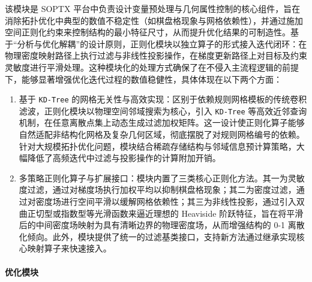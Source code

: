该模块是 SOPTX 平台中负责设计变量预处理与几何属性控制的核心组件，旨在消除拓扑优化中典型的数值不稳定性（如棋盘格现象与网格依赖性），并通过施加空间正则化约束来控制结构的最小特征尺寸，从而提升优化结果的可制造性。基于“分析与优化解耦”的设计原则，正则化模块以独立算子的形式接入迭代闭环：在物理密度映射路径上执行过滤与非线性投影操作，在梯度更新路径上对目标及约束灵敏度进行平滑处理。这种模块化的处理方式确保了在不侵入主流程逻辑的前提下，能够显著增强优化迭代过程的数值稳健性，具体体现在以下两个方面：
\begin{enumerate}[
	label={（\arabic*）},
	labelsep=0.25em,
	leftmargin=3.2em,
	itemsep=0.4em,
	topsep=0.4em,
	parsep=0pt,
	partopsep=0pt
	]
	\item 基于 \texttt{KD-Tree} 的网格无关性与高效实现：区别于依赖规则网格模板的传统卷积滤波，正则化模块以物理空间邻域搜索为核心，引入 \texttt{KD-Tree} 等高效近邻查询机制，在任意离散点集上动态生成过滤加权矩阵。这一设计使正则化算子能够自然适配非结构化网格及复杂几何区域，彻底摆脱了对规则网格编号的依赖。针对大规模拓扑优化问题，模块结合稀疏存储结构与邻域信息预计算策略，大幅降低了高频迭代中过滤与投影操作的计算附加开销。
	
	\item 多策略正则化算子与扩展接口：模块内置了三类核心正则化方法。其一为灵敏度过滤，通过对梯度场执行加权平均以抑制棋盘格现象；其二为密度过滤，通过对密度场进行空间平滑以缓解网格依赖性；其三为非线性投影，通过引入双曲正切型或指数型等光滑函数来逼近理想的 Heaviside 阶跃特征，旨在将平滑后的中间密度场映射为具有清晰边界的物理密度场，从而增强结构的 0-1 离散化倾向。此外，模块提供了统一的过滤基类接口，支持新方法通过继承实现核心映射算子来快速接入。
\end{enumerate}

\paragraph*{优化模块}

